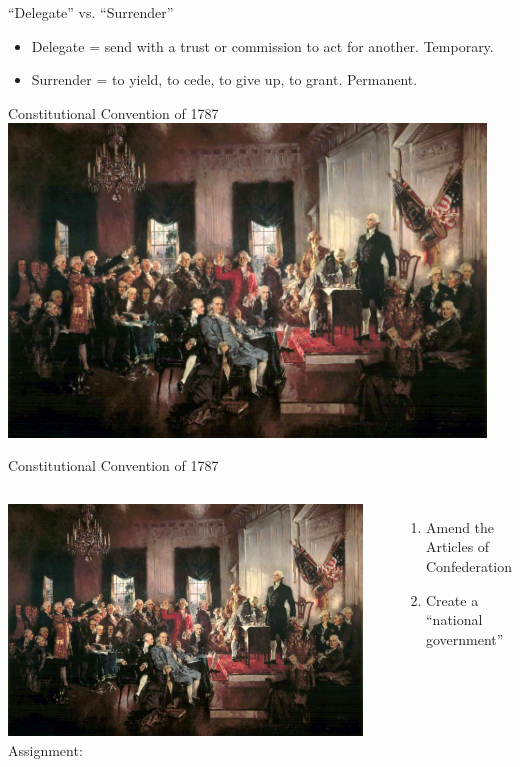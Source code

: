 \begin{frame}{``Delegate'' vs. ``Surrender''}
    \begin{itemize}
        \item Delegate = send with a trust or commission to act for another. Temporary.
        \item Surrender = to yield, to cede, to give up, to grant. Permanent.
    \end{itemize}
\end{frame}

\begin{frame}{Constitutional Convention of 1787}
    \centering
    \includegraphics[width=0.95\textwidth]{img/constitutional-convention.jpg} \\
\end{frame}

\begin{frame}{Constitutional Convention of 1787}
    \begin{columns}[onlytextwidth]
            \centering
            \includegraphics[width=0.95\textwidth]{img/constitutional-convention.jpg} \\

            Assignment:
            \begin{enumerate}
                \item Amend the Articles of Confederation
                \item Create a “national government”
            \end{enumerate}
    \end{columns}
\end{frame}

